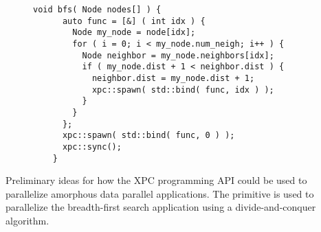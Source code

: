 

  \cbxsetfontsize{8pt}
  \begin{subfigure}{\tw}
  \begin{Verbatim}[gobble=4]
    void bfs( Node nodes[] ) {
      auto func = [&] ( int idx ) {
        Node my_node = node[idx];
        for ( i = 0; i < my_node.num_neigh; i++ ) {
          Node neighbor = my_node.neighbors[idx];
          if ( my_node.dist + 1 < neighbor.dist ) {
            neighbor.dist = my_node.dist + 1;
            xpc::spawn( std::bind( func, idx ) );
          }
        }
      };
      xpc::spawn( std::bind( func, 0 ) );
      xpc::sync();
    }
  \end{Verbatim}
  \end{subfigure}

  \caption{ Preliminary
    ideas for how the XPC programming API could be used to parallelize
    amorphous data parallel applications. The  primitive is
    used to parallelize the breadth-first search application using a
    divide-and-conquer algorithm.}
  \label{fig-xpc-api}

